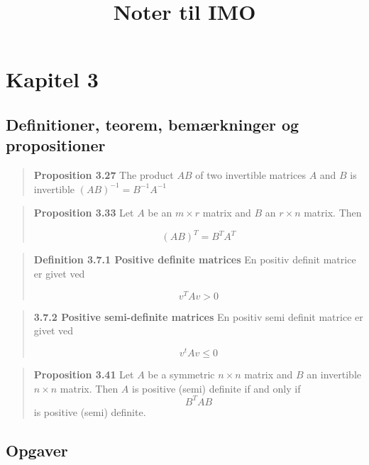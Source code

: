 \documentclass[a4paper, 12pt]{article}
\title{Noter til IMO}
\begin{document}
	
	\maketitle
	
	\section*{Kapitel 3}
	
	\subsection{Definitioner, teorem, bemærkninger og propositioner}
	
	\begin{quote}
		\textbf{Proposition 3.27} The product  $ AB $ of two invertible matrices $ A $ and $ B $ is invertible $ (AB)^{-1} = B^{-1}A^{-1} $
	\end{quote}
	
	\begin{quote}
		\textbf{Proposition 3.33} Let $ A $ be an $ m \times r $ matrix and $ B $ an $ r\times n $ matrix. Then

		\[ (A B)^T = B^T A^T \]
		
	\end{quote}
	
	\begin{quote}
		\textbf{Definition 3.7.1 Positive definite matrices}
		En positiv definit matrice er givet ved 
		
		\[ v^TAv > 0 \]
		
	\end{quote}
	
	\begin{quote}
		\textbf{3.7.2 Positive semi-definite matrices}
		En positiv semi definit matrice er givet ved
		
		\[ v^tAv \leq 0 \]
	\end{quote}
	
	\begin{quote}
		\textbf{Proposition 3.41} Let $ A $ be a symmetric $ n\times n $ matrix and $ B $ an invertible $ n\times n $ matrix. Then $ A $ is positive (semi) definite if and only if
		\[ B^T A B \]
		is positive (semi) definite.
	\end{quote}
	
	
	\subsection{Opgaver}
	
\end{document}

